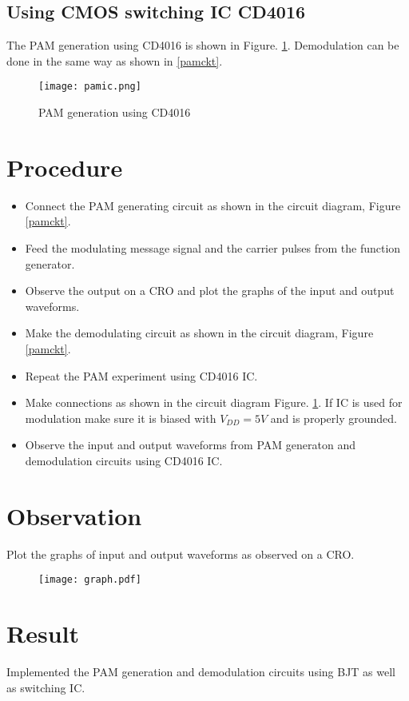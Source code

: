 \subsection*{Using CMOS switching IC CD4016}
The PAM generation using CD4016 is shown in Figure. \ref{pamckt2}. Demodulation can be done in the same way as shown in \ref{pamckt}.

\begin{figure}
\texttt{[image: pamic.png]}
\caption{PAM generation using CD4016}
\label{pamckt2}
\end{figure}

\section*{Procedure}
\begin{itemize}
\item
Connect the PAM generating circuit as shown in the circuit diagram, Figure \ref{pamckt}.
\item
Feed the modulating message signal and the carrier pulses from the function generator.
\item
Observe the output on a CRO and plot the graphs of the input and output waveforms.
\item
Make the demodulating circuit as shown in the circuit diagram, Figure \ref{pamckt}.
\item
Repeat the PAM experiment using CD4016 IC.
\item
Make connections as shown in the circuit diagram Figure. \ref{pamckt2}. If IC is used for modulation make sure it is biased with $V_{DD}=5V$ and is properly grounded.
\item
Observe the input and output waveforms from PAM generaton and demodulation circuits using CD4016 IC.

\end{itemize}
\section*{Observation}
Plot the graphs of input and output waveforms as observed on a CRO.

\begin{figure}
	\texttt{[image: graph.pdf]}
\end{figure}
\section*{Result}

Implemented the PAM generation and demodulation circuits using BJT as well as switching IC.